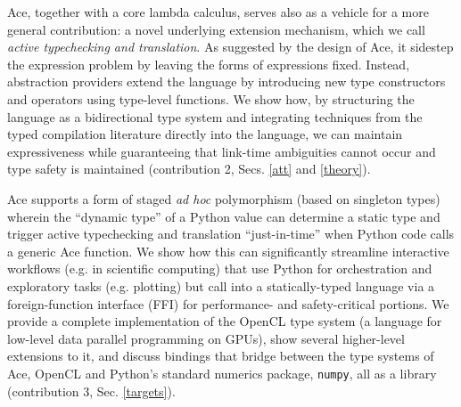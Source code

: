 \documentclass[10pt,preprint]{sigplanconf}
\newcommand{\lamAce}{\lambda_{\text{Ace}}}
\begin{document}
Ace, together with a core lambda calculus, serves also as a vehicle for a more general contribution: a novel  underlying extension mechanism, which we call \emph{active typechecking and translation}. As suggested by the design of Ace, it sidestep the expression problem by leaving the forms of expressions fixed. Instead, abstraction providers extend the language by introducing new type constructors and operators using type-level functions. We show how, by  structuring the language as a bidirectional type system and integrating techniques from the typed compilation literature directly into the language, we can maintain expressiveness while  guaranteeing that link-time ambiguities cannot occur and type safety is maintained (contribution 2, Secs. \ref{att} and \ref{theory}).





Ace supports a form of staged \emph{ad hoc} polymorphism (based on singleton types) wherein the ``dynamic type'' of a Python value can determine a static type and trigger active typechecking and translation ``just-in-time'' when Python code calls a generic Ace function. We show how this can significantly streamline interactive workflows (e.g. in scientific computing) that use Python for orchestration and exploratory tasks (e.g. plotting) but call into a statically-typed  language via a foreign-function interface (FFI) for performance- and safety-critical portions. We provide a complete implementation of the OpenCL type system (a language for low-level data parallel programming on GPUs), show several higher-level extensions to it, and discuss bindings that bridge between the type systems of Ace, OpenCL and Python's standard numerics package, \verb|numpy|, all as a library (contribution 3, Sec. \ref{targets}).%

\end{document}
